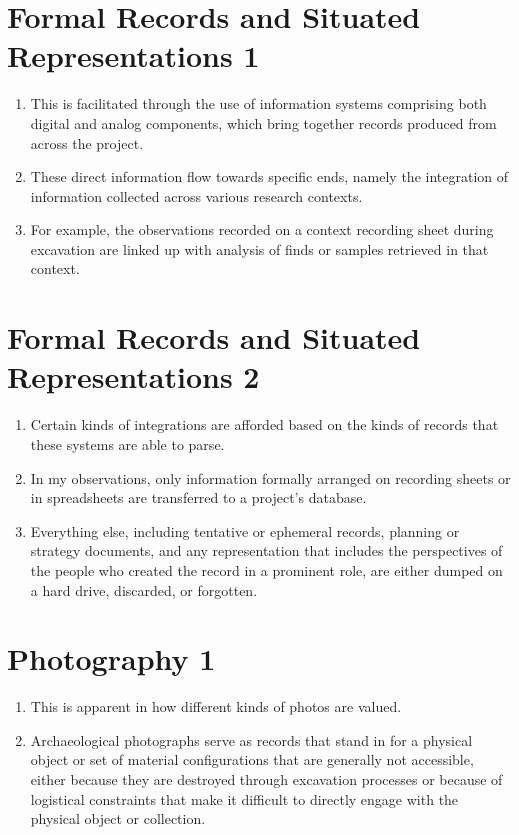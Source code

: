 \documentclass[12pt]{article}
\begin{document}
\section{Formal Records and Situated Representations 1}
\begin{enumerate}
  \item This is facilitated through the use of information systems comprising both digital and analog components, which bring together records produced from across the project.
  \item These direct information flow towards specific ends, namely the integration of information collected across various research contexts.
  \item For example, the observations recorded on a context recording sheet during excavation are linked up with analysis of finds or samples retrieved in that context.
\end{enumerate}
  
\section{Formal Records and Situated Representations 2}
\begin{enumerate}
  \item Certain kinds of integrations are afforded based on the kinds of records that these systems are able to parse.
  \item In my observations, only information formally arranged on recording sheets or in spreadsheets are transferred to a project's database.
  \item Everything else, including tentative or ephemeral records, planning or strategy documents, and any representation that includes the perspectives of the people who created the record in a prominent role, are either dumped on a hard drive, discarded, or forgotten.
\end{enumerate}

\section{Photography 1}
\begin{enumerate}
  \item This is apparent in how different kinds of photos are valued.
  \item Archaeological photographs serve as records that stand in for a physical object or set of material configurations that are generally not accessible, either because they are destroyed through excavation processes or because of logistical constraints that make it difficult to directly engage with the physical object or collection.
\end{enumerate}
\end{document}
